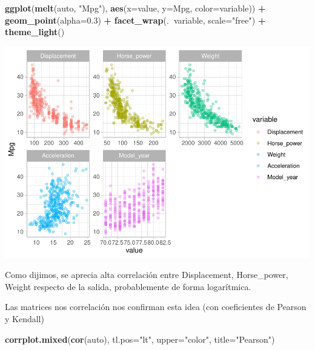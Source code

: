 \documentclass[
]{article}
\newenvironment{Shaded}{\begin{snugshade}}{\end{snugshade}}
\newcommand{\DataTypeTok}[1]{\textcolor[rgb]{0.13,0.29,0.53}{#1}}
\newcommand{\FloatTok}[1]{\textcolor[rgb]{0.00,0.00,0.81}{#1}}
\newcommand{\KeywordTok}[1]{\textcolor[rgb]{0.13,0.29,0.53}{\textbf{#1}}}
\newcommand{\NormalTok}[1]{#1}
\newcommand{\OperatorTok}[1]{\textcolor[rgb]{0.81,0.36,0.00}{\textbf{#1}}}
\newcommand{\StringTok}[1]{\textcolor[rgb]{0.31,0.60,0.02}{#1}}
\begin{document}
\begin{Shaded}
\begin{Highlighting}[]
\KeywordTok{ggplot}\NormalTok{(}\KeywordTok{melt}\NormalTok{(auto, }\StringTok{"Mpg"}\NormalTok{), }\KeywordTok{aes}\NormalTok{(}\DataTypeTok{x=}\NormalTok{value, }\DataTypeTok{y=}\NormalTok{Mpg, }\DataTypeTok{color=}\NormalTok{variable)) }\OperatorTok{+}
\StringTok{  }\KeywordTok{geom_point}\NormalTok{(}\DataTypeTok{alpha=}\FloatTok{0.3}\NormalTok{) }\OperatorTok{+}
\StringTok{  }\KeywordTok{facet_wrap}\NormalTok{(.}\OperatorTok{~}\NormalTok{variable, }\DataTypeTok{scale=}\StringTok{"free"}\NormalTok{) }\OperatorTok{+}
\StringTok{  }\KeywordTok{theme_light}\NormalTok{()}
\end{Highlighting}
\end{Shaded}

\begin{center}\includegraphics{Regresion_files/figure-latex/unnamed-chunk-2-1} \end{center}

Como dijimos, se aprecia alta correlación entre Displacement,
Horse\_power, Weight respecto de la salida, probablemente de forma
logarítmica.

Las matrices nos correlación nos confirman esta idea (con coeficientes
de Pearson y Kendall)

\begin{Shaded}
\begin{Highlighting}[]
\KeywordTok{corrplot.mixed}\NormalTok{(}\KeywordTok{cor}\NormalTok{(auto), }\DataTypeTok{tl.pos=}\StringTok{"lt"}\NormalTok{, }\DataTypeTok{upper=}\StringTok{"color"}\NormalTok{, }\DataTypeTok{title=}\StringTok{"Pearson"}\NormalTok{)}
\end{Highlighting}
\end{Shaded}
\end{document}
